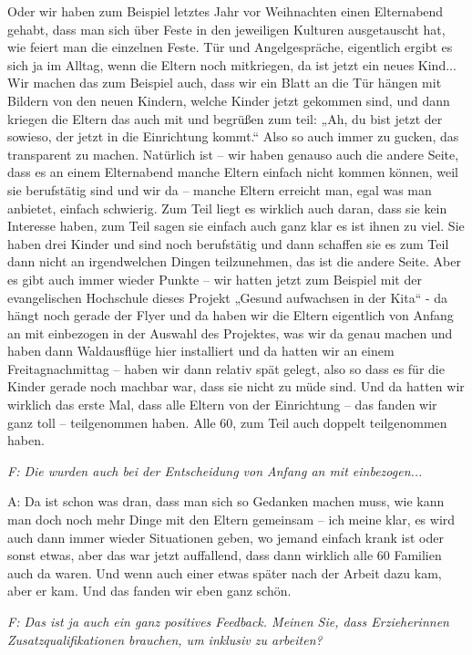 \begin{linenumbers*}
Oder wir haben zum Beispiel letztes Jahr vor Weihnachten einen Elternabend gehabt, dass man sich über Feste in den jeweiligen Kulturen ausgetauscht hat, wie feiert man die einzelnen Feste. Tür und Angelgespräche, eigentlich ergibt es sich ja im Alltag, wenn die Eltern noch mitkriegen, da ist jetzt ein neues Kind... Wir machen das zum Beispiel auch, dass wir ein Blatt an die Tür hängen mit Bildern von den neuen Kindern, welche Kinder jetzt gekommen sind, und dann kriegen die Eltern das auch mit und begrüßen zum teil: „Ah, du bist jetzt der sowieso, der jetzt in die Einrichtung kommt.“ 
Also  so auch immer zu gucken, das transparent zu machen. Natürlich ist – wir haben genauso auch die andere Seite, dass es an einem Elternabend manche Eltern einfach nicht kommen können, weil sie berufstätig sind und wir da – manche Eltern erreicht man, egal was man anbietet, einfach schwierig.  Zum Teil liegt es wirklich auch daran, dass sie kein Interesse haben, zum Teil sagen sie einfach auch ganz klar es ist ihnen zu viel. Sie haben drei Kinder und sind noch berufstätig und dann schaffen sie es zum Teil dann nicht an irgendwelchen Dingen teilzunehmen, das ist die andere Seite. Aber es gibt auch immer wieder Punkte – wir hatten jetzt zum Beispiel mit der evangelischen Hochschule dieses Projekt „Gesund aufwachsen in der Kita“ - da hängt noch gerade der Flyer und da haben wir die Eltern eigentlich von Anfang an mit einbezogen in der Auswahl des Projektes, was wir da genau machen und haben dann Waldausflüge hier installiert und da hatten wir an einem Freitagnachmittag – haben wir dann relativ spät gelegt, also so dass es für die Kinder gerade noch machbar war, dass sie nicht zu müde sind. Und da hatten wir wirklich das erste Mal, dass alle Eltern von der Einrichtung – das fanden wir ganz toll – teilgenommen haben. Alle 60, zum Teil auch doppelt teilgenommen haben.

\emph{F: Die wurden auch bei der Entscheidung von Anfang an mit einbezogen...}

A: Da ist schon was dran, dass man sich so Gedanken machen muss, wie kann man doch noch mehr Dinge mit den Eltern gemeinsam – ich meine klar, es wird auch dann immer wieder Situationen geben, wo jemand einfach krank ist oder sonst etwas, aber das war jetzt auffallend, dass dann wirklich alle 60 Familien auch da waren. Und wenn auch einer etwas später nach der Arbeit dazu kam, aber er kam. Und das fanden wir eben ganz schön.

\emph{F: Das ist ja auch ein ganz positives Feedback.
Meinen Sie, dass Erzieherinnen Zusatzqualifikationen brauchen, um inklusiv zu arbeiten?}


\end{linenumbers*}
